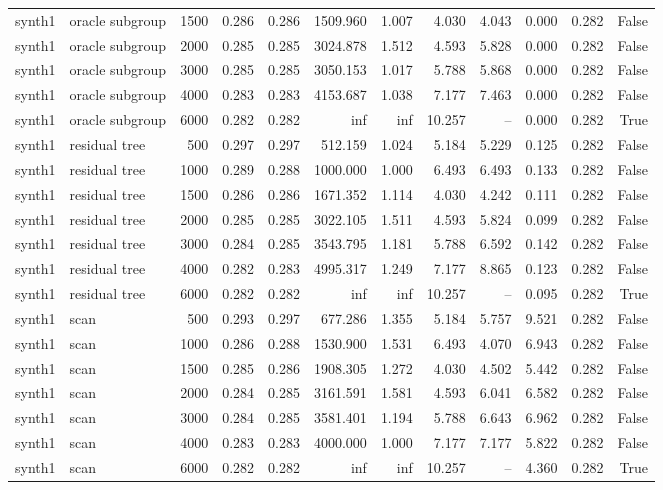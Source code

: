 \begin{tabular}{llrrrrrrrrrr}
synth1 & oracle subgroup & 1500 & 0.286 & 0.286 & 1509.960 & 1.007 & 4.030 & 4.043 & 0.000 & 0.282 & False \\
synth1 & oracle subgroup & 2000 & 0.285 & 0.285 & 3024.878 & 1.512 & 4.593 & 5.828 & 0.000 & 0.282 & False \\
synth1 & oracle subgroup & 3000 & 0.285 & 0.285 & 3050.153 & 1.017 & 5.788 & 5.868 & 0.000 & 0.282 & False \\
synth1 & oracle subgroup & 4000 & 0.283 & 0.283 & 4153.687 & 1.038 & 7.177 & 7.463 & 0.000 & 0.282 & False \\
synth1 & oracle subgroup & 6000 & 0.282 & 0.282 & inf & inf & 10.257 & -- & 0.000 & 0.282 & True \\
synth1 & residual tree & 500 & 0.297 & 0.297 & 512.159 & 1.024 & 5.184 & 5.229 & 0.125 & 0.282 & False \\
synth1 & residual tree & 1000 & 0.289 & 0.288 & 1000.000 & 1.000 & 6.493 & 6.493 & 0.133 & 0.282 & False \\
synth1 & residual tree & 1500 & 0.286 & 0.286 & 1671.352 & 1.114 & 4.030 & 4.242 & 0.111 & 0.282 & False \\
synth1 & residual tree & 2000 & 0.285 & 0.285 & 3022.105 & 1.511 & 4.593 & 5.824 & 0.099 & 0.282 & False \\
synth1 & residual tree & 3000 & 0.284 & 0.285 & 3543.795 & 1.181 & 5.788 & 6.592 & 0.142 & 0.282 & False \\
synth1 & residual tree & 4000 & 0.282 & 0.283 & 4995.317 & 1.249 & 7.177 & 8.865 & 0.123 & 0.282 & False \\
synth1 & residual tree & 6000 & 0.282 & 0.282 & inf & inf & 10.257 & -- & 0.095 & 0.282 & True \\
synth1 & scan & 500 & 0.293 & 0.297 & 677.286 & 1.355 & 5.184 & 5.757 & 9.521 & 0.282 & False \\
synth1 & scan & 1000 & 0.286 & 0.288 & 1530.900 & 1.531 & 6.493 & 4.070 & 6.943 & 0.282 & False \\
synth1 & scan & 1500 & 0.285 & 0.286 & 1908.305 & 1.272 & 4.030 & 4.502 & 5.442 & 0.282 & False \\
synth1 & scan & 2000 & 0.284 & 0.285 & 3161.591 & 1.581 & 4.593 & 6.041 & 6.582 & 0.282 & False \\
synth1 & scan & 3000 & 0.284 & 0.285 & 3581.401 & 1.194 & 5.788 & 6.643 & 6.962 & 0.282 & False \\
synth1 & scan & 4000 & 0.283 & 0.283 & 4000.000 & 1.000 & 7.177 & 7.177 & 5.822 & 0.282 & False \\
synth1 & scan & 6000 & 0.282 & 0.282 & inf & inf & 10.257 & -- & 4.360 & 0.282 & True \\

\end{tabular}
